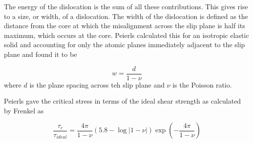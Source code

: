 The energy of the dislocation is the sum of all these contributions. This gives rise to a size, or width, of a dislocation. The width of the dislocation is defined as the distance from the core at which the misalignment across the slip plane is half its maximum, which occurs at the core. Peierls calculated this for an isotropic elastic solid and accounting for only the atomic planes immediately adjacent to the slip plane and found it to be 

\begin{equation}
w = \frac{d}{1-\nu}
\end{equation}
where $d$ is the plane spacing across teh slip plane and $\nu$ is the Poisson ratio.


Peierls gave the critical stress in terms of the ideal shear strength as calculated by Frenkel %
as 


\begin{equation}
\frac{\tau_c}{\tau_{ideal}} = \frac{4 \pi}{1 - \nu} (5.8 - \log|1-\nu|) \exp\left(-\frac{4\pi}{1 - \nu}\right)
\end{equation}




























